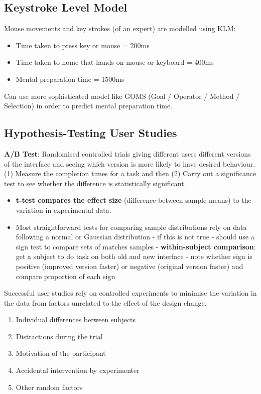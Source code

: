 \documentclass{article}
\begin{document}
\subsection{Keystroke Level Model}
Mouse movements and key strokes (of an expert) are modelled using KLM:
\begin{itemize}
    \item Time taken to press key or mouse = 200ms
    \item Time taken to home that hands on mouse or keyboard = 400ms
    \item Mental preparation time = 1500ms
\end{itemize}

Can use more sophisticated model like GOMS (Goal / Operator / Method / Selection) in order to predict mental preparation time.

\subsection{Hypothesis-Testing User Studies}
\textbf{A/B Test}: Randomised controlled trials giving different users different versions of the interface and seeing which version is more likely to have desired behaviour. (1) Measure the completion times for a task and then (2) Carry out a significance test to see whether the difference is statistically significant.
\begin{itemize}
    \item \textbf{t-test compares the effect size} (difference between sample means) to the variation in experimental data.
    \item Most straightforward tests for comparing sample distributions rely on data following a normal or Gaussian distribution - if this is not true - should use a sign test to compare sets of matches samples - \textbf{within-subject comparison}: get a subject to do task on both old and new interface - note whether sign is positive (improved version faster) or negative (original version faster) and compare proportion of each sign
\end{itemize}

Successful user studies rely on controlled experiments to minimise the variation in the data from factors unrelated to the effect of the design change. 
\begin{enumerate}
    \item Individual differences between subjects
    \item Distractions during the trial
    \item Motivation of the participant
    \item Accidental intervention by experimenter
    \item Other random factors
\end{enumerate}
\end{document}

